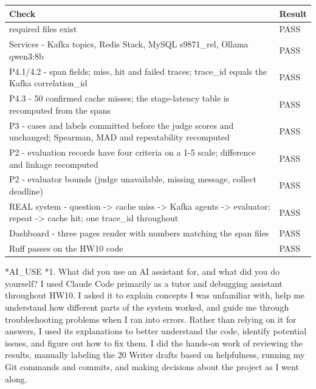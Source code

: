 \documentclass[11pt]{article}
\makeatletter
\renewcommand\section{\@startsection{section}{1}{\z@}{-3.0ex \@plus -1ex \@minus -.2ex}{1.2ex \@plus.2ex}{\normalfont\fontsize{14}{17}\selectfont\bfseries}}
\renewcommand\subsection{\@startsection{subsection}{2}{\z@}{-2.2ex \@plus -1ex \@minus -.2ex}{0.8ex \@plus.2ex}{\normalfont\fontsize{12}{14.5}\selectfont\bfseries}}
\makeatother
\begin{document}
\begin{center}
{\footnotesize\setlength{\tabcolsep}{3pt}
\begin{tabular}{>{\raggedright\arraybackslash}p{5.4in}l}
\toprule
\textbf{Check} & \textbf{Result} \\
\midrule
required files exist & PASS \\
Services - Kafka topics, Redis Stack, MySQL s9871\_\allowbreak{}rel, Ollama qwen3:8b & PASS \\
P4.1/4.2 - span fields; miss, hit and failed traces; trace\_\allowbreak{}id equals the Kafka correlation\_\allowbreak{}id & PASS \\
P4.3 - 50 confirmed cache misses; the stage-latency table is recomputed from the spans & PASS \\
P3 - cases and labels committed before the judge scores and unchanged; Spearman, MAD and repeatability recomputed & PASS \\
P2 - evaluation records have four criteria on a 1-5 scale; difference and linkage recomputed & PASS \\
P2 - evaluator bounds (judge unavailable, missing message, collect deadline) & PASS \\
REAL system - question -> cache miss -> Kafka agents -> evaluator; repeat -> cache hit; one trace\_\allowbreak{}id throughout & PASS \\
Dashboard - three pages render with numbers matching the span files & PASS \\
Ruff passes on the HW10 code & PASS \\
\bottomrule
\end{tabular}}
\end{center}
\section*{AI\_USE}
\subsection*{1. What did you use an AI assistant for, and what did you do yourself?}
I used Claude Code primarily as a tutor and debugging assistant throughout HW10. I asked it to explain concepts I was unfamiliar with, help me understand how different parts of the system worked, and guide me through troubleshooting problems when I ran into errors. Rather than relying on it for answers, I used its explanations to better understand the code, identify potential issues, and figure out how to fix them. I did the hands-on work of reviewing the results, manually labeling the 20 Writer drafts based on helpfulness, running my Git commands and commits, and making decisions about the project as I went along.
\end{document}
